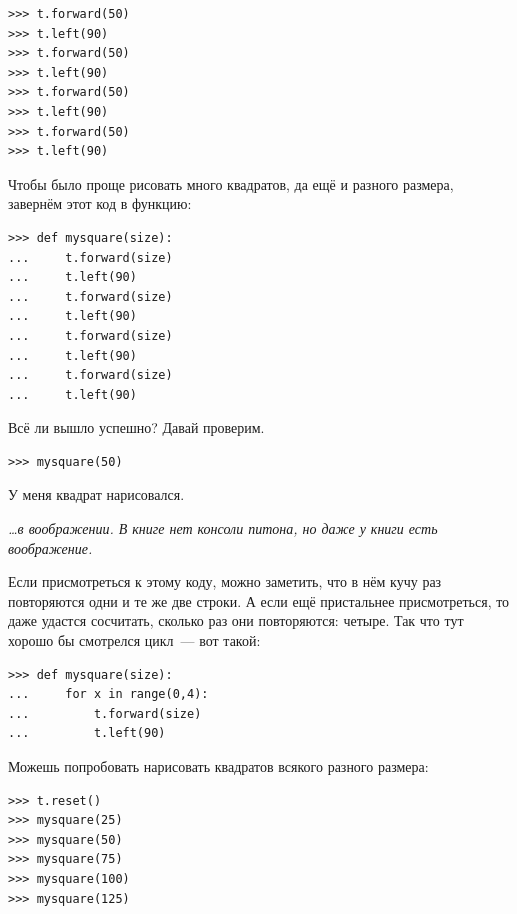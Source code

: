 \begin{listing}
\begin{verbatim}
>>> t.forward(50)
>>> t.left(90)
>>> t.forward(50)
>>> t.left(90)
>>> t.forward(50)
>>> t.left(90)
>>> t.forward(50)
>>> t.left(90)
\end{verbatim}
\end{listing}

Чтобы было проще рисовать много квадратов, да ещё и разного размера, завернём этот код в функцию:

\begin{listing}
\begin{verbatim}
>>> def mysquare(size):
...     t.forward(size)
...     t.left(90)
...     t.forward(size)
...     t.left(90)
...     t.forward(size)
...     t.left(90)
...     t.forward(size)
...     t.left(90)
\end{verbatim}
\end{listing}

Всё ли вышло успешно? Давай проверим.

\begin{listing}
\begin{verbatim}
>>> mysquare(50)
\end{verbatim}
\end{listing}

У меня квадрат нарисовался.

\emph {…в воображении. В книге нет консоли питона, но даже у книги есть воображение.}

Если присмотреться к этому коду, можно заметить, что в нём кучу раз повторяются одни и те же две строки. А если ещё пристальнее присмотреться, то даже удастся сосчитать, сколько раз они повторяются: четыре. Так что тут хорошо бы смотрелся цикл — вот такой:

\begin{listing}
\begin{verbatim}
>>> def mysquare(size):
...     for x in range(0,4):
...         t.forward(size)
...         t.left(90)
\end{verbatim}
\end{listing}

Можешь попробовать нарисовать квадратов всякого разного размера:

\begin{listing}
\begin{verbatim}
>>> t.reset()
>>> mysquare(25)
>>> mysquare(50)
>>> mysquare(75)
>>> mysquare(100)
>>> mysquare(125)
\end{verbatim}
\end{listing}

